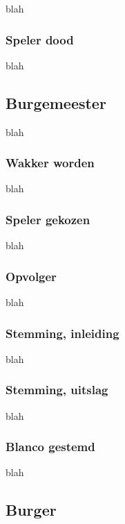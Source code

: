 \documentclass[12pt]{article}
\begin{document}
      blah
    
    \subsubsection{Speler dood}
    
      blah
  
  \subsection{Burgemeester}
    
      blah
  
    \subsubsection{Wakker worden}
    
      blah
    
    \subsubsection{Speler gekozen}
    
      blah
    
    \subsubsection{Opvolger}
    
      blah
    
    \subsubsection{Stemming, inleiding}
    
      blah
    
    \subsubsection{Stemming, uitslag}
    
      blah
    
    \subsubsection{Blanco gestemd}
    
      blah
      
  \subsection{Burger}
  
\end{document}
